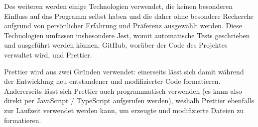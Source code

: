 Des weiteren werden einige Technologien verwendet, die keinen besonderen Einfluss auf das Programm selbst haben und die daher ohne besondere Recherche aufgrund von persönlicher Erfahrung und Präferenz ausgewählt werden. Diese Technologien umfassen insbesondere Jest, womit automatische Tests geschrieben und ausgeführt werden können, GitHub, worüber der Code des Projektes verwaltet wird, und Prettier.

Prettier wird aus zwei Gründen verwendet: einerseits lässt sich damit während der Entwicklung neu entstandener und modifizierter Code formatieren. Andererseits lässt sich Prettier auch programmatisch verwenden (es kann also direkt per JavaScript / TypeScript aufgerufen werden), weshalb Prettier ebenfalls zur Laufzeit verwendet werden kann, um erzeugte und modifizierte Dateien zu formatieren.
